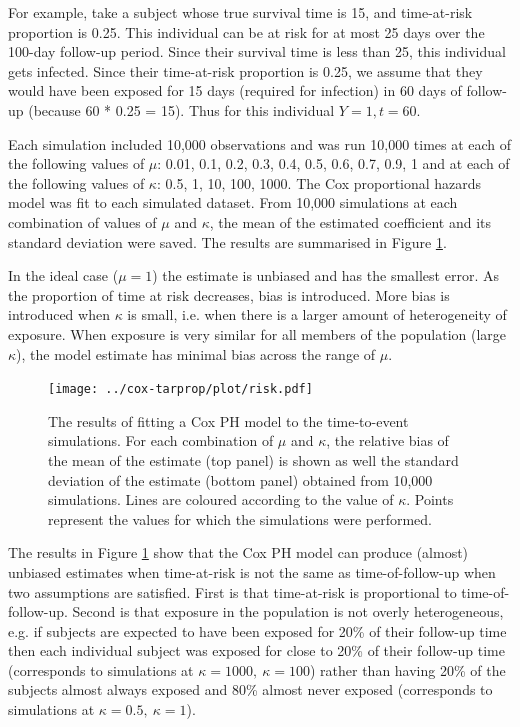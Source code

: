 For example, take a subject whose true survival time is 15, and time-at-risk proportion is 0.25. This individual can be at risk for at most 25 days over the 100-day follow-up period. Since their survival time is less than 25, this individual gets infected. Since their time-at-risk proportion is 0.25, we assume that they would have been exposed for 15 days (required for infection) in 60 days of follow-up (because 60 * 0.25 = 15). Thus for this individual $Y=1, t=60$.

Each simulation included 10,000 observations and was run 10,000 times at each of the following values of $\mu$: 0.01, 0.1, 0.2, 0.3, 0.4, 0.5, 0.6, 0.7, 0.9, 1 and at each of the following values of $\kappa$: 0.5, 1, 10, 100, 1000. The Cox proportional hazards model was fit to each simulated dataset. From 10,000 simulations at each combination of values of $\mu$ and $\kappa$, the mean of the estimated coefficient and its standard deviation were saved. The results are summarised in Figure \ref{CoxSimResults}.

In the ideal case ($\mu = 1$) the estimate is unbiased and has the smallest error. As the proportion of time at risk decreases, bias is introduced. More bias is introduced when $\kappa$ is small, i.e. when there is a larger amount of heterogeneity of exposure. When exposure is very similar for all members of the population (large $\kappa$), the model estimate has minimal bias across the range of $\mu$.

\begin{figure}[htp]
	\centering
	\texttt{[image: ../cox-tarprop/plot/risk.pdf]}
	\caption{
		The results of fitting a Cox PH model to the time-to-event simulations. For each combination of $\mu$ and $\kappa$, the relative bias of the mean of the estimate (top panel) is shown as well the standard deviation of the estimate (bottom panel) obtained from 10,000 simulations. Lines are coloured according to the value of $\kappa$. Points represent the values for which the simulations were performed.
	}
	\label{CoxSimResults}
\end{figure}

The results in Figure \ref{CoxSimResults} show that the Cox PH model can produce (almost) unbiased estimates when time-at-risk is not the same as time-of-follow-up when two assumptions are satisfied. First is that time-at-risk is proportional to time-of-follow-up. Second is that exposure in the population is not overly heterogeneous, e.g. if subjects are expected to have been exposed for 20\% of their follow-up time then each individual subject was exposed for close to 20\% of their follow-up time (corresponds to simulations at $\kappa = 1000,\ \kappa = 100$) rather than having 20\% of the subjects almost always exposed and 80\% almost never exposed (corresponds to simulations at $\kappa = 0.5,\ \kappa = 1$).

